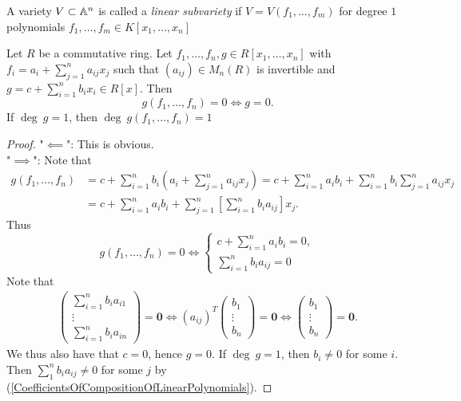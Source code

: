 \begin{definition}
    A variety $V\subset \mathbb{A}^n$ is called a \textit{linear subvariety} if $V=V(f_1,\dots,f_m)$ for degree $1$ polynomials $f_1,\dots,f_m\in K[x_1,\dots,x_n]$
\end{definition}
\begin{lemma}\label{CompositionOfLinearPolynomials}
    Let $R$ be a commutative ring. Let $f_1,\dots,f_n,g\in R[x_1,\dots,x_n]$ with $f_i = a_i+\sum_{j=1}^n a_{ij}x_j$ such that $(a_{ij})\in M_n(R)$ is invertible and $g=c+\sum_{i=1}^n b_ix_i\in R[x]$. Then $$g(f_1,\dots,f_n)=0\iff g=0.$$ 
    If $\deg\ g = 1$, then $\deg\ g(f_1,\dots,f_n) = 1$
\end{lemma}
\begin{proof}
    "$\impliedby$": This is obvious.\\
    "$\implies$": Note that
    \begin{align*}
        g(f_1,\dots,f_n) &= c + \sum_{i=1}^n b_i\left( a_i+\sum_{j=1}^na_{ij}x_j\right) = c+\sum_{i=1}^n a_ib_i + \sum_{i=1}^n b_i\sum_{j=1}^na_{ij}x_j\\ &= c+\sum_{i=1}^n a_ib_i + \sum_{j=1}^n \left[\sum_{i=1}^nb_ia_{ij}\right]x_j. 
    \end{align*}
    Thus 
    $$g(f_1,\dots,f_n)=0 \iff \begin{cases}c+\sum_{i=1}^n a_ib_i = 0,\\   \sum_{i=1}^nb_ia_{ij}=0 \end{cases}$$
    Note that
    \begin{gather}\label{CoefficientsOfCompositionOfLinearPolynomials} \begin{pmatrix} \sum_{i=1}^nb_ia_{i1}\\ \vdots \\ \sum_{i=1}^nb_ia_{in}\end{pmatrix} = \mathbf{0} \iff (a_{ij})^T\begin{pmatrix}
        b_1\\ \vdots \\ b_n 
    \end{pmatrix} =\mathbf{0} \iff \begin{pmatrix}
        b_1\\ \vdots \\ b_n
    \end{pmatrix}=\mathbf{0}.
    \end{gather}
    We thus also have that $c=0$, hence $g=0$.
    If $\deg \ g = 1$, then $b_i\neq 0$ for some $i$. Then $\sum_1^n b_ia_{ij} \neq 0$ for some $j$ by (\ref{CoefficientsOfCompositionOfLinearPolynomials}).
\end{proof}
